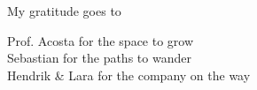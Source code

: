 \begin{center}
    
\vspace*{4cm}
My gratitude goes to 

Prof. Acosta for the space to grow \\
Sebastian for the paths to wander \\
Hendrik \& Lara for the company on the way
\end{center}